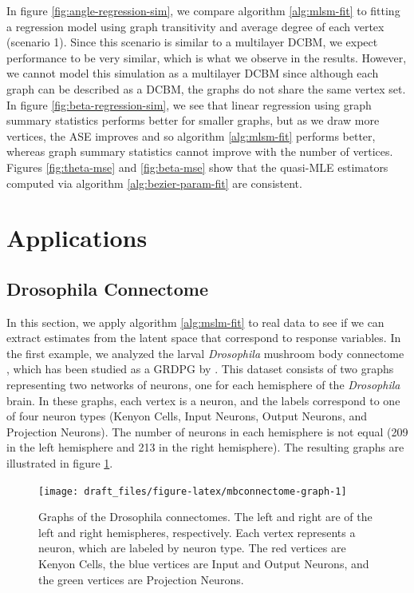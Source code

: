 \documentclass[12pt]{article}
\begin{document}
In figure \ref{fig:angle-regression-sim}, we compare algorithm
\ref{alg:mlsm-fit} to fitting a regression model using graph
transitivity and average degree of each vertex (scenario 1). Since this
scenario is similar to a multilayer DCBM, we expect performance to be
very similar, which is what we observe in the results. However, we
cannot model this simulation as a multilayer DCBM since although each
graph can be described as a DCBM, the graphs do not share the same
vertex set. In figure \ref{fig:beta-regression-sim}, we see that linear
regression using graph summary statistics performs better for smaller
graphs, but as we draw more vertices, the ASE improves and so algorithm
\ref{alg:mlsm-fit} performs better, whereas graph summary statistics
cannot improve with the number of vertices. Figures \ref{fig:theta-mse}
and \ref{fig:beta-mse} show that the quasi-MLE estimators computed via
algorithm \ref{alg:bezier-param-fit} are consistent.

\section{Applications}\label{applications}

\subsection{Drosophila Connectome}\label{drosophila-connectome}

In this section, we apply algorithm \ref{alg:mslm-fit} to real data to
see if we can extract estimates from the latent space that correspond to
response variables. In the first example, we analyzed the larval
\emph{Drosophila} mushroom body connectome \citep{Eichler141762}, which
has been studied as a GRDPG by \citet{athreya2020estimation}. This
dataset consists of two graphs representing two networks of neurons, one
for each hemisphere of the \emph{Drosophila} brain. In these graphs,
each vertex is a neuron, and the labels correspond to one of four neuron
types (Kenyon Cells, Input Neurons, Output Neurons, and Projection
Neurons). The number of neurons in each hemisphere is not equal (209 in
the left hemisphere and 213 in the right hemisphere). The resulting
graphs are illustrated in figure \ref{fig:mbconnectome-graph}.

\begin{figure}[H]

{\centering \texttt{[image: draft\_files/figure-latex/mbconnectome-graph-1]} 

}

\caption{Graphs of the Drosophila connectomes. The left and right are of the left and right hemispheres, respectively. Each vertex represents a neuron, which are labeled by neuron type. The red vertices are Kenyon Cells, the blue vertices are Input and Output Neurons, and the green vertices are Projection Neurons.}\label{fig:mbconnectome-graph}
\end{figure}
\end{document}
